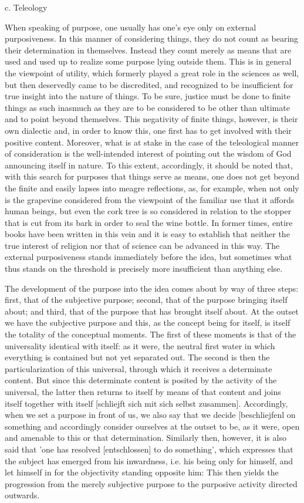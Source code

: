 c. Teleology

When speaking of purpose, one usually has one's eye only on external
purposiveness. In this manner of considering things, they do not count as bearing
their determination in themselves. Instead they count merely as means that are
used and used up to realize some purpose lying outside them. This is in general
the viewpoint of utility, which formerly played a great role in the sciences as well,
but then deservedly came to be discredited, and recognized to be insufficient for
true insight into the nature of things. To be sure, justice must be done to finite
things as such inasmuch as they are to be considered to be other than ultimate
and to point beyond themselves. This negativity of finite things, however, is their
own dialectic and, in order to know this, one first has to get involved with their
positive content. Moreover, what is at stake in the case of the teleological manner
of consideration is the well-intended interest of pointing out the wisdom of God
announcing itself in nature. To this extent, accordingly, it should be noted that,
with this search for purposes that things serve as means, one does not get beyond
the finite and easily lapses into meagre reflections, as, for example, when not only
is the grapevine considered from the viewpoint of the familiar use that it affords
human beings, but even the cork tree is so considered in relation to the stopper
that is cut from its bark in order to seal the wine bottle. In former times, entire
books have been written in this vein and it is easy to establish that neither the true
interest of religion nor that of science can be advanced in this way. The external
purposiveness stands immediately before the idea, but sometimes what thus stands
on the threshold is precisely more insufficient than anything else.

The development of the purpose into the idea comes about by way
of three steps: first, that of the subjective purpose; second, that of the purpose
bringing itself about; and third, that of the purpose that has
brought itself about. At the outset we have the subjective purpose and this, as
the concept being for itself, is itself the totality of the conceptual moments. The
first of these moments is that of the universality identical with itself: as it were, the
neutral first water in which everything is contained but not yet separated out. The
second is then the particularization of this universal, through which it receives a
determinate content. But since this determinate content is posited by the activity
of the universal, the latter then returns to itself by means of that content and
joins itself together with itself [schliejft sich mit sich selbst zusammen]. Accordingly,
when we set a purpose in front of us, we also say that we decide [beschliejfenl
on something and accordingly consider ourselves at the outset to be, as it were,
open and amenable to this or that determination. Similarly then, however, it is
also said that 'one has resolved [entschlossen] to do something', which expresses
that the subject has emerged from his inwardness, i.e. his being only for himself,
and let himself in for the objectivity standing opposite him: This then yields the
progression from the merely subjective purpose to the purposive activity directed
outwards.


